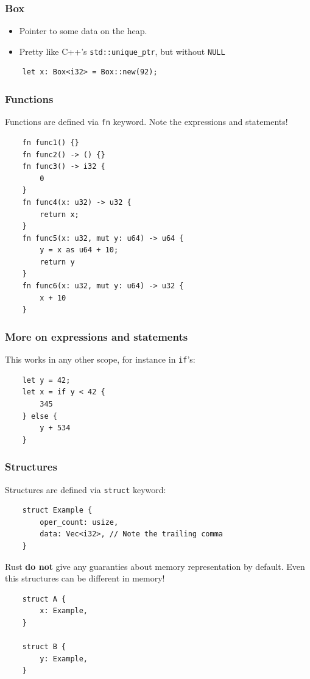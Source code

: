 \documentclass[aspectratio=1610,t]{beamer}
\begin{document}
\begin{frame}[fragile]
\frametitle{Box}
\begin{itemize}
    \item Pointer to some data on the heap.
    \item Pretty like C++'s \texttt{std::unique\_ptr}, but without \texttt{NULL}
\end{itemize}

\begin{verbatim}
    let x: Box<i32> = Box::new(92);
\end{verbatim}
\end{frame}


\begin{frame}[fragile]
\frametitle{Functions}
Functions are defined via \texttt{fn} keyword. Note the expressions and statements!

\begin{verbatim}
    fn func1() {}
    fn func2() -> () {}
    fn func3() -> i32 {
        0
    }
    fn func4(x: u32) -> u32 {
        return x;
    }
    fn func5(x: u32, mut y: u64) -> u64 {
        y = x as u64 + 10;
        return y
    }
    fn func6(x: u32, mut y: u64) -> u32 {
        x + 10
    }
\end{verbatim}
\end{frame}


\begin{frame}[fragile]
\frametitle{More on expressions and statements}
This works in any other scope, for instance in \texttt{if}'s:

\begin{verbatim}
    let y = 42;
    let x = if y < 42 {
        345
    } else {
        y + 534
    }
\end{verbatim}
\end{frame}


\begin{frame}[fragile]
\frametitle{Structures}
Structures are defined via \texttt{struct} keyword:

\begin{verbatim}
    struct Example {
        oper_count: usize,
        data: Vec<i32>, // Note the trailing comma
    }
\end{verbatim}

Rust \textbf{do not} give any guaranties about memory representation by default. Even this structures can be different in memory!

\begin{verbatim}
    struct A {
        x: Example,
    }

    struct B {
        y: Example,
    }
\end{verbatim}
\end{frame}
\end{document}
